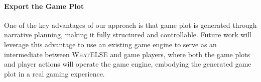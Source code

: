 \paragraph{Export the Game Plot} One of the key advantages of our approach is that game plot is generated through narrative planning, making it fully structured and controllable.  
Future work will leverage this advantage to use an existing game engine to serve as an intermediate between \textsc{WhatELSE} and game players, where both the game plots and player actions will operate the game engine, embodying the generated game plot in a real gaming experience. 







